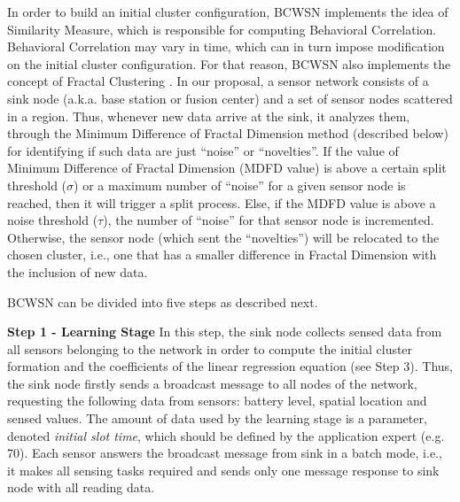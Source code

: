 \documentclass{acm_proc_article-sp}
\begin{document}
In order to build an initial cluster configuration, BCWSN implements the idea of
Similarity Measure, which is responsible for computing Behavioral Correlation.
Behavioral Correlation may vary in time, which can in turn impose modification
on the initial cluster configuration. For that reason, BCWSN also implements the
concept of Fractal Clustering \cite{Barbara2000}. In our proposal, a sensor
network consists of a sink node (a.k.a. base station or fusion center) and a set
of sensor nodes scattered in a region.
Thus, whenever new data arrive at the sink, it analyzes them, through the
Minimum Difference of Fractal Dimension method (described below) for identifying
if such data are just ``noise'' or ``novelties''. If the value of Minimum
Difference of Fractal Dimension (MDFD value) is above a certain split threshold
($\sigma$) or a maximum number of ``noise'' for a given sensor node is reached,
then it will trigger a split process. Else, if the MDFD value is above a noise
threshold ($\tau$), the number of ``noise'' for that sensor node is
incremented. Otherwise, the sensor node (which sent the ``novelties'') will be
relocated to the chosen cluster, i.e., one that has a smaller difference in
Fractal Dimension with the inclusion of new data.
\vspace*{-.3cm}


BCWSN can be divided into five steps as described next.
\vspace*{-.3cm}

{\bf Step 1 - Learning Stage}
In this step, the sink node collects sensed data from all sensors {belonging to
the network} in order to compute the initial cluster formation and the
coefficients of the linear regression equation (see Step 3). Thus, the sink 
node firstly sends a broadcast message to all
nodes of the network, requesting the following data from sensors:
battery level, spatial location and sensed values. The amount of data used by the
learning stage is a parameter, denoted \textit{initial slot time}, which should be
defined by the application expert (e.g. 70). Each sensor answers the broadcast
message from sink in a batch mode, i.e., it makes all sensing tasks required and
sends only one message response to sink node with all reading data.
\vspace*{-.3cm}
\end{document}
